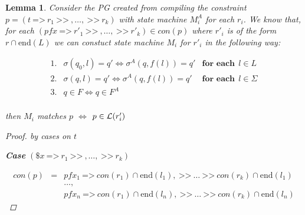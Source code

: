 \documentclass[twocolumn]{sig-alternate-10pt}
\newcommand{\Prefer}{\texttt{>>}}
\newcommand{\Path}{\texttt{=>}}
\newtheorem{lem}[thm]{Lemma}
\begin{document}



\begin{lem}
  Consider the PG created from compiling the constraint $p = (t ~\Path~ r_1 ~\Prefer~,\dots, ~\Prefer~ r_k)$ with state machine $M^A_i$ for each $r_i$. We know that, for each $(pfx ~\Path~ r'_1 ~\Prefer~,\dots, ~\Prefer~ r'_k) \in con(p)$ where $r'_i$ is of the form $r \cap \text{end}(L)$ we can constuct state machine $M_i$ for $r'_i$ in the following way:
    
    \[ \begin{array}{lll}
      1. & \sigma(q_0,l) = q' \iff \sigma^A(q,f(l)) = q' & \textbf{for each}~~ l \in L \\
      2. & \sigma(q,l) = q' \iff \sigma^A(q,f(l)) = q' & \textbf{for each}~~ l \in \Sigma \\
      3. & q \in F \iff q \in F^A & \\
    \end{array} \]

  then $M_i$ matches $p$ $\iff$ $p \in \mathcal{L}(r_i')$
  
  \vspace{1em}
  \begin{proof} by cases on $t$

    \vspace{1em}

    \textbf{Case} $(\$x ~\Path~ r_1 ~\Prefer~,\dots, ~\Prefer~ r_k)$

    \[ \begin{array}{lcl}
      con(p) &=& pfx_1 ~\Path~ con(r_1) \cap \text{end}(l_1), ~\Prefer~ \dots ~\Prefer~ con(r_k) \cap \text{end}(l_1)  \\
             & & \dots, \\
             & & pfx_n ~\Path~ con(r_1) \cap \text{end}(l_n), ~\Prefer~ \dots ~\Prefer~ con(r_k) \cap \text{end}(l_n)
    \end{array} \]


\end{proof}
\end{lem}
\end{document}
